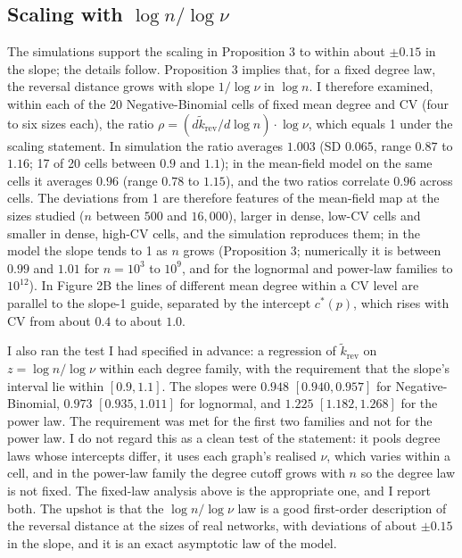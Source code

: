 \documentclass{nws}
\begin{document}
\subsection{Scaling with $\log n/\log\nu$}

The simulations support the scaling in Proposition 3 to within about $\pm0.15$ in the slope; the details follow. Proposition 3 implies that, for a fixed degree law, the reversal distance grows
with slope $1/\log\nu$ in $\log n$. I therefore examined, within each of the 20
Negative-Binomial cells of fixed mean degree and CV (four to six sizes each), the
ratio $\rho=(d\tilde k_{\mathrm{rev}}/d\log n)\cdot\log\nu$, which equals 1
under the scaling statement. In simulation the ratio averages $1.003$ (SD $0.065$,
range $0.87$ to $1.16$; 17 of 20 cells between $0.9$ and $1.1$); in the mean-field
model on the same cells it averages $0.96$ (range $0.78$ to $1.15$), and the two
ratios correlate $0.96$ across cells. The deviations from 1 are therefore features
of the mean-field map at the sizes studied ($n$ between $500$ and $16{,}000$), larger
in dense, low-CV cells and smaller in dense, high-CV cells, and the simulation
reproduces them; in the model the slope tends to 1 as $n$ grows (Proposition 3; numerically it is between $0.99$ and $1.01$ for $n=10^3$ to $10^9$, and for the lognormal and power-law families to $10^{12}$). In Figure 2B the lines of different
mean degree within a CV level are parallel to the slope-1 guide, separated by the intercept $c^*(p)$, which rises with CV from about $0.4$ to about $1.0$.

I also ran the test I had specified in advance: a regression of
$\tilde k_{\mathrm{rev}}$ on $z=\log n/\log\nu$ within each degree family, with the
requirement that the slope's interval lie within $[0.9,1.1]$. The slopes were $0.948$
$[0.940,0.957]$ for Negative-Binomial, $0.973$ $[0.935,1.011]$ for lognormal,
and $1.225$ $[1.182,1.268]$ for the power law. The requirement was met for the first two families and not for the power law. I do not regard this as a clean test
of the statement: it pools degree laws whose intercepts differ, it uses each
graph's realised $\nu$, which varies within a cell, and in the power-law family the
degree cutoff grows with $n$ so the degree law is not fixed. The fixed-law analysis
above is the appropriate one, and I report both. The upshot is that the
$\log n/\log\nu$ law is a good first-order description of the reversal distance at
the sizes of real networks, with deviations of about $\pm0.15$ in the slope, and it is an
exact asymptotic law of the model.
\end{document}
